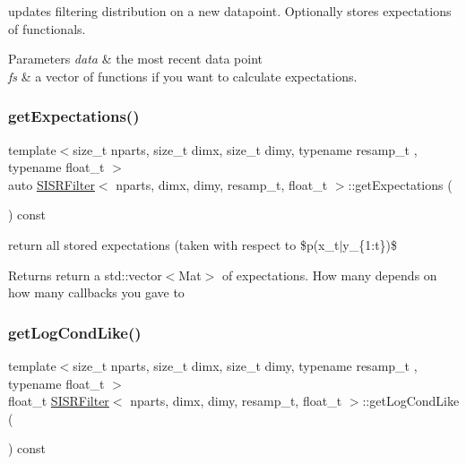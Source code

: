 updates filtering distribution on a new datapoint. Optionally stores expectations of functionals. 


\begin{DoxyParams}{Parameters}
{\em data} & the most recent data point \\
\hline
{\em fs} & a vector of functions if you want to calculate expectations. \\
\hline
\end{DoxyParams}
\mbox{\label{classSISRFilter_a88ef9409ded3ec7e6745e184daad86c4}} 
\subsubsection{\texorpdfstring{get\+Expectations()}{getExpectations()}}
{\footnotesize\ttfamily template$<$size\+\_\+t nparts, size\+\_\+t dimx, size\+\_\+t dimy, typename resamp\+\_\+t , typename float\+\_\+t $>$ \\
auto \hyperlink{classSISRFilter}{S\+I\+S\+R\+Filter}$<$ nparts, dimx, dimy, resamp\+\_\+t, float\+\_\+t $>$\+::get\+Expectations (\begin{DoxyParamCaption}{ }\end{DoxyParamCaption}) const}



return all stored expectations (taken with respect to \$p(x\+\_\+t$\vert$y\+\_\+\{1\+:t\})\$ 

\begin{DoxyReturn}{Returns}
return a std\+::vector$<$\+Mat$>$ of expectations. How many depends on how many callbacks you gave to 
\end{DoxyReturn}
\mbox{\label{classSISRFilter_a48bdb88b2ed4041ab6d8a6547703ebf3}} 
\subsubsection{\texorpdfstring{get\+Log\+Cond\+Like()}{getLogCondLike()}}
{\footnotesize\ttfamily template$<$size\+\_\+t nparts, size\+\_\+t dimx, size\+\_\+t dimy, typename resamp\+\_\+t , typename float\+\_\+t $>$ \\
float\+\_\+t \hyperlink{classSISRFilter}{S\+I\+S\+R\+Filter}$<$ nparts, dimx, dimy, resamp\+\_\+t, float\+\_\+t $>$\+::get\+Log\+Cond\+Like (\begin{DoxyParamCaption}{ }\end{DoxyParamCaption}) const}



